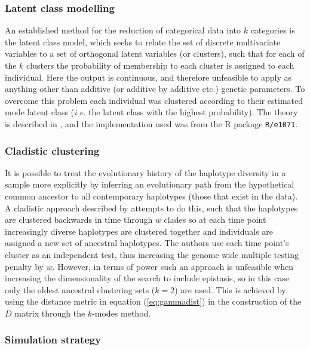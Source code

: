 \subsubsection{Latent class modelling}

An established method for the reduction of categorical data into $k$ categories is the latent class model, which seeks to relate the set of discrete multivariate variables to a set of orthogonal latent variables (or clusters), such that for each of the $k$ clusters the probability of membership to each cluster is assigned to each individual. Here the output is continuous, and therefore unfeasible to apply as anything other than additive (or additive by additive etc.) genetic parameters. To overcome this problem each individual was clustered according to their estimated mode latent class (\emph{i.e.} the latent class with the highest probability). The theory is described in \cite{Goodman1974}, and the implementation used was from the R package {\tt R/e1071}.


\subsubsection{Cladistic clustering}

It is possible to treat the evolutionary history of the haplotype diversity in a sample more explicitly by inferring an evolutionary path from the hypothetical common ancestor to all contemporary haplotypes (those that exist in the data). A cladistic approach described by \cite{Durrant2004} attempts to do this, such that the haplotypes are clustered backwards in time through $w$ clades so at each time point increasingly diverse haplotypes are clustered together and individuals are assigned a new set of ancestral haplotypes. The authors use each time point's cluster as an independent test, thus increasing the genome wide multiple testing penalty by $w$. However, in terms of power such an approach is unfeasible when increasing the dimensionality of the search to include epistasis, so in this case only the oldest ancestral clustering sets ($k = 2$) are used. This is achieved by using the distance metric in equation (\ref{eq:gammadist}) in the construction of the $D$ matrix through the $k$-modes method.


\subsubsection{Simulation strategy} \label{sec:unsupervised_methods}

